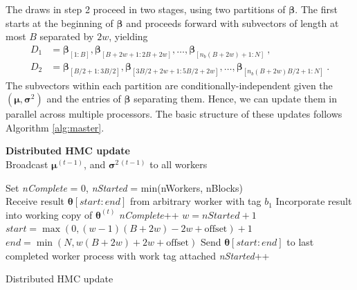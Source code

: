 The draws in step 2 proceed in two stages, using two partitions of $\bm \beta$.
The first starts at the beginning of $\bm \beta$ and proceeds forward with subvectors of length at most $B$ separated by $2w$, yielding
\begin{align}
D_1 &= \bm \beta_{[1 : B]}, \bm \beta_{[B + 2w + 1 : 2B + 2w]}, \ldots, \bm \beta_{[n_b (B + 2w) + 1 : N]} \ , \\
D_2 &= \bm \beta_{[B/2 + 1 : 3B/2]}, \bm \beta_{[3B/2 + 2w + 1 : 5B/2 + 2w]}, \ldots, \bm \beta_{[n_b (B + 2w) B/2 + 1 : N]} \ .
\end{align}
The subvectors within each partition are conditionally-independent given the $(\bm \mu, \bm \sigma^2)$ and the entries of $\bm \beta$ separating them.
Hence, we can update them in parallel across multiple processors.
The basic structure of these updates follows Algorithm \ref{alg:master}.
%
\begin{algorithm}%
 \hspace{-8pt} \textbf{Distributed HMC update}\\

 Broadcast $\bm \mu^{(t-1)}$, and $\bm \sigma^{2\,(t-1)}$ to all workers \;

  {

 Set \textit{nComplete} = 0, \textit{nStarted} = min(nWorkers, nBlocks) \\
  {
   Receive result $\bm \theta[start:end]$ from arbitrary worker with tag $b_1$ \;
   Incorporate result into working copy of $\bm \theta^{(t)}$ \;
   \textit{nComplete}++ \;
    {
     $w = nStarted + 1$\;
     $start = \max(0, (w - 1)(B + 2w) - 2w + \mbox{offset}) + 1$\;
     $end = \min(N, w(B + 2w) + 2w + \mbox{offset})$\;
     Send $\bm \theta[start:end] $ to last completed worker process with work tag attached\;
     \textit{nStarted}++\;
   }
 }
}

 \caption{Distributed HMC update \label{alg:master}}
\end{algorithm}

